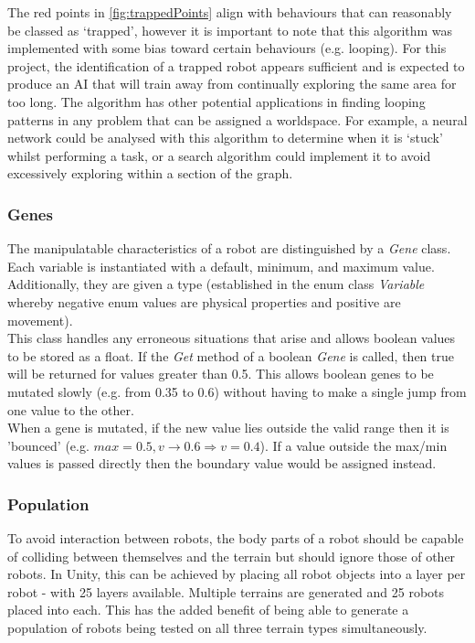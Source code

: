 \documentclass{article}
\begin{document}
The red points in \autoref{fig:trappedPoints} align with behaviours that can reasonably be classed as ‘trapped’, however it is important to note that this algorithm was implemented with some bias toward certain behaviours (e.g. looping). For this project, the identification of a trapped robot appears sufficient and is expected to produce an AI that will train away from continually exploring the same area for too long. The algorithm has other potential applications in finding looping patterns in any problem that can be assigned a worldspace. For example, a neural network could be analysed with this algorithm to determine when it is ‘stuck’ whilst performing a task, or a search algorithm could implement it to avoid excessively exploring within a section of the graph. 


\subsubsection{Genes}
\label{sec:Genes Imp}
The manipulatable characteristics of a robot are distinguished by a \textit{Gene} class. Each variable is instantiated with a default, minimum, and maximum value. Additionally, they are given a type (established in the enum class \textit{Variable} whereby negative enum values are physical properties and positive are movement). \\
This class handles any erroneous situations that arise and allows boolean values to be stored as a float. If the \textit{Get} method of a boolean \textit{Gene} is called, then true will be returned for values greater than 0.5. This allows boolean genes to be mutated slowly (e.g. from 0.35 to 0.6) without having to make a single jump from one value to the other. \\
When a gene is mutated, if the new value lies outside the valid range then it is 'bounced' (e.g. $max=0.5, v\rightarrow0.6 \Rightarrow v=0.4$). If a value outside the max/min values is passed directly then the boundary value would be assigned instead.

\subsubsection{Population}
\label{sec:Population Imp}
To avoid interaction between robots, the body parts of a robot should be capable of colliding between themselves and the terrain but should ignore those of other robots. In Unity, this can be achieved by placing all robot objects into a layer per robot - with 25 layers available.  Multiple terrains are generated and 25 robots placed into each. This has the added benefit of being able to generate a population of robots being tested on all three terrain types simultaneously. 
\end{document}
